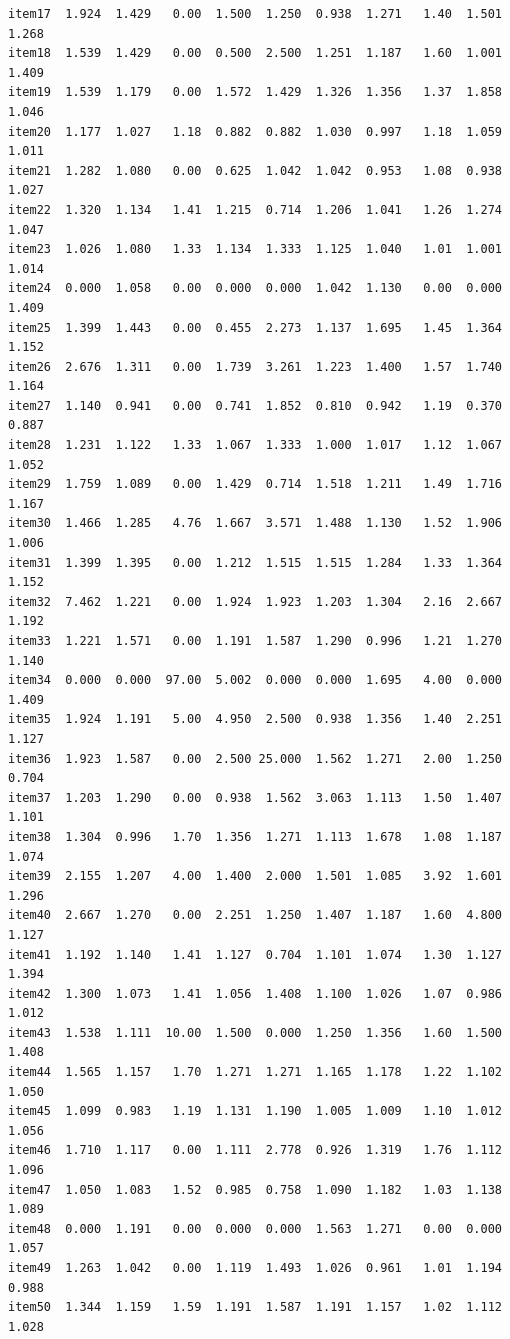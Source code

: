 \documentclass[
  a4paper,
]{ltjsbook}
\begin{document}
\begin{verbatim}
item17  1.924  1.429   0.00  1.500  1.250  0.938  1.271   1.40  1.501  1.268
item18  1.539  1.429   0.00  0.500  2.500  1.251  1.187   1.60  1.001  1.409
item19  1.539  1.179   0.00  1.572  1.429  1.326  1.356   1.37  1.858  1.046
item20  1.177  1.027   1.18  0.882  0.882  1.030  0.997   1.18  1.059  1.011
item21  1.282  1.080   0.00  0.625  1.042  1.042  0.953   1.08  0.938  1.027
item22  1.320  1.134   1.41  1.215  0.714  1.206  1.041   1.26  1.274  1.047
item23  1.026  1.080   1.33  1.134  1.333  1.125  1.040   1.01  1.001  1.014
item24  0.000  1.058   0.00  0.000  0.000  1.042  1.130   0.00  0.000  1.409
item25  1.399  1.443   0.00  0.455  2.273  1.137  1.695   1.45  1.364  1.152
item26  2.676  1.311   0.00  1.739  3.261  1.223  1.400   1.57  1.740  1.164
item27  1.140  0.941   0.00  0.741  1.852  0.810  0.942   1.19  0.370  0.887
item28  1.231  1.122   1.33  1.067  1.333  1.000  1.017   1.12  1.067  1.052
item29  1.759  1.089   0.00  1.429  0.714  1.518  1.211   1.49  1.716  1.167
item30  1.466  1.285   4.76  1.667  3.571  1.488  1.130   1.52  1.906  1.006
item31  1.399  1.395   0.00  1.212  1.515  1.515  1.284   1.33  1.364  1.152
item32  7.462  1.221   0.00  1.924  1.923  1.203  1.304   2.16  2.667  1.192
item33  1.221  1.571   0.00  1.191  1.587  1.290  0.996   1.21  1.270  1.140
item34  0.000  0.000  97.00  5.002  0.000  0.000  1.695   4.00  0.000  1.409
item35  1.924  1.191   5.00  4.950  2.500  0.938  1.356   1.40  2.251  1.127
item36  1.923  1.587   0.00  2.500 25.000  1.562  1.271   2.00  1.250  0.704
item37  1.203  1.290   0.00  0.938  1.562  3.063  1.113   1.50  1.407  1.101
item38  1.304  0.996   1.70  1.356  1.271  1.113  1.678   1.08  1.187  1.074
item39  2.155  1.207   4.00  1.400  2.000  1.501  1.085   3.92  1.601  1.296
item40  2.667  1.270   0.00  2.251  1.250  1.407  1.187   1.60  4.800  1.127
item41  1.192  1.140   1.41  1.127  0.704  1.101  1.074   1.30  1.127  1.394
item42  1.300  1.073   1.41  1.056  1.408  1.100  1.026   1.07  0.986  1.012
item43  1.538  1.111  10.00  1.500  0.000  1.250  1.356   1.60  1.500  1.408
item44  1.565  1.157   1.70  1.271  1.271  1.165  1.178   1.22  1.102  1.050
item45  1.099  0.983   1.19  1.131  1.190  1.005  1.009   1.10  1.012  1.056
item46  1.710  1.117   0.00  1.111  2.778  0.926  1.319   1.76  1.112  1.096
item47  1.050  1.083   1.52  0.985  0.758  1.090  1.182   1.03  1.138  1.089
item48  0.000  1.191   0.00  0.000  0.000  1.563  1.271   0.00  0.000  1.057
item49  1.263  1.042   0.00  1.119  1.493  1.026  0.961   1.01  1.194  0.988
item50  1.344  1.159   1.59  1.191  1.587  1.191  1.157   1.02  1.112  1.028

\end{verbatim}
\end{document}
